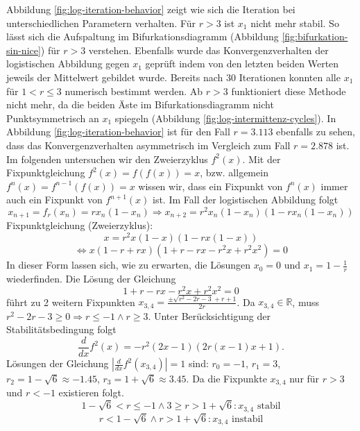 \documentclass[11,5pt, twoside]{article}
\begin{document}
Abbildung \ref{fig:log-iteration-behavior} zeigt wie sich die Iteration bei unterschiedlichen Parametern verhalten. Für $r>3$ ist $x_1$ nicht mehr stabil. So lässt sich die Aufspaltung im Bifurkationsdiagramm (Abbildung \ref{fig:bifurkation-sin-nice}) für $r>3$ verstehen. Ebenfalls wurde das Konvergenzverhalten der logistischen Abbildung gegen $x_1$ geprüft indem von den letzten beiden Werten jeweils der Mittelwert gebildet wurde. Bereits nach 30 Iterationen konnten alle $x_1$ für $1 < r \leq 3$ numerisch bestimmt werden. Ab $r>3$ funktioniert diese Methode nicht mehr, da die beiden Äste im Bifurkationsdiagramm nicht Punktsymmetrisch an $x_1$ spiegeln (Abbildung \ref{fig:log-intermittenz-cycles}). In Abbildung \ref{fig:log-iteration-behavior} ist für den Fall $r=3.113$ ebenfalls zu sehen, dass das Konvergenzverhalten asymmetrisch im Vergleich zum Fall $r=2.878$ ist.
\newline
Im folgenden untersuchen wir den Zweierzyklus $f^2(x)$. Mit der Fixpunktgleichung $f^2(x)=f(f(x))=x$, bzw. allgemein $f^{n}(x)=f^{n-1}(f(x))=x$ wissen wir, dass ein Fixpunkt von $f^n(x)$ immer auch ein Fixpunkt von $f^{n+1}(x)$ ist. Im Fall der logistischen Abbildung folgt
\begin{equation}
x_{n+1}=f_r(x_n)=rx_n(1-x_n)
\Rightarrow x_{n+2}=r^2x_n(1-x_n)(1-rx_n(1-x_n))\end{equation}
\newline
Fixpunktgleichung (Zweierzyklus):
\begin{equation}
x=r^2x(1-x)(1-rx(1-x))
\end{equation}
\begin{equation}
\Leftrightarrow x(1-r+rx)(1+r-rx-r^2x+r^2x^2)=0
\end{equation}
In dieser Form lassen sich, wie zu erwarten, die Lösungen $x_0=0$ und $x_1=1-\frac{1}{r}$ wiederfinden.
Die Lösung der Gleichung
\begin{equation}
1+r-rx-r^2x+r^2x^2=0
\end{equation}
führt zu 2 weitern Fixpunkten $x_{3,4}=\frac{\pm\sqrt{r^2-2 r-3}+r+1}{2 r}$.
Da $x_{3,4} \in \mathbb{R} $, muss $r^2-2 r-3 \geq 0 \Rightarrow r \leq -1 \land r \geq 3$.
\newline
Unter Berücksichtigung der Stabilitätsbedingung folgt
\begin{equation}
\frac{d}{dx}f^2(x)=-r^2(2x-1)(2r(x-1)x+1).
\end{equation}
Lösungen der Gleichung $|\frac{d}{dx}f^2(x_{3,4})|=1$ sind: $r_0=-1$, $r_1=3$, $r_2=1-\sqrt{6}\approx-1.45$, $r_3=1+\sqrt{6}\approx3.45$.
\newline
Da die Fixpunkte $x_{3,4}$ nur für $r>3$ und $r<-1$ existieren folgt.
\begin{equation}1-\sqrt{6}< r \leq -1 \wedge 3 \geq r > 1+\sqrt{6}: x_{3,4} \text{ stabil}
\end{equation}
\begin{equation}r < 1-\sqrt{6} \wedge r>1+\sqrt{6}: x_{3,4} \text{ instabil}
\end{equation}
\end{document}
